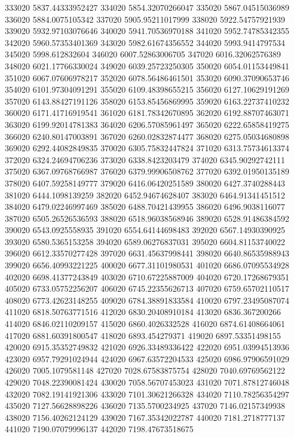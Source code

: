 {333020 5837.44333952427
334020 5854.32070266047
335020 5867.04515036989
336020 5884.0075105342
337020 5905.95211017999
338020 5922.54757921939
339020 5932.97103076646
340020 5941.70536970188
341020 5952.74785342355
342020 5960.57353401369
343020 5982.61674356552
344020 5993.9414797534
345020 5998.612832604
346020 6007.52863006705
347020 6016.32062576389
348020 6021.17766330024
349020 6039.25723250305
350020 6054.01153449841
351020 6067.07606978217
352020 6078.56486461501
353020 6090.37090653746
354020 6101.97304091291
355020 6109.48398655215
356020 6127.10629191269
357020 6143.88427191126
358020 6153.85456869995
359020 6163.22737410232
360020 6171.41716919541
361020 6181.78342670895
362020 6192.88707463071
363020 6199.92014781383
364020 6206.57085961497
365020 6222.65858419275
366020 6240.80147003891
367020 6260.02832874477
368020 6275.05034680898
369020 6292.44082849835
370020 6305.75832447824
371020 6313.75734613374
372020 6324.24694706236
373020 6338.8423203479
374020 6345.90292742111
375020 6367.09768766987
376020 6379.99906508762
377020 6392.01950135189
378020 6407.59258149777
379020 6416.06420251589
380020 6427.3740288443
381020 6444.1098139259
382020 6452.94674628407
383020 6464.91341451512
384020 6479.02246997469
385020 6488.70421439955
386020 6496.9038116077
387020 6505.26526536593
388020 6518.96038568946
389020 6528.91486384592
390020 6543.0925558935
391020 6554.64144698483
392020 6567.14930390925
393020 6580.5365153258
394020 6589.06276837031
395020 6604.81153740022
396020 6612.33570277428
397020 6631.45637998441
398020 6640.86535988943
399020 6656.40993221225
400020 6677.31101980531
401020 6686.07095534928
402020 6698.41377243849
403020 6710.67225887009
404020 6720.17268679351
405020 6733.05752256207
406020 6745.22355626713
407020 6759.65702110517
408020 6773.42623148255
409020 6784.38891833584
410020 6797.23495087074
411020 6818.50763771516
412020 6830.20408910184
413020 6836.367200266
414020 6846.02110209157
415020 6860.4026332528
416020 6874.61408664061
417020 6881.60391800547
418020 6893.454279371
419020 6897.53351498155
420020 6915.35352749832
421020 6926.33489336422
422020 6951.03994513936
423020 6957.79291024944
424020 6967.63572204533
425020 6986.97906591029
426020 7005.1079581148
427020 7028.67583875754
428020 7040.69769562122
429020 7048.22390081424
430020 7058.56707453023
431020 7071.87812746048
432020 7082.19141921306
433020 7101.30621266328
434020 7110.78256354297
435020 7127.56628898226
436020 7135.5700234925
437020 7146.02157349938
438020 7156.40262124129
439020 7167.35342022787
440020 7181.2718777137
441020 7190.07079996137
442020 7198.47673518675
}
